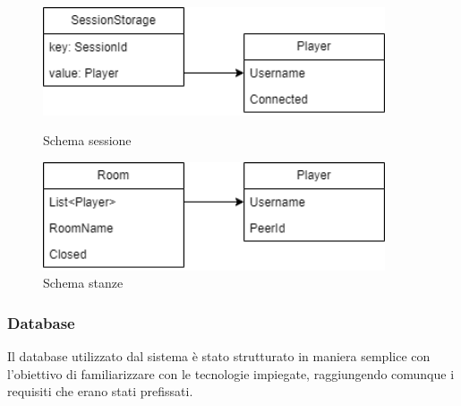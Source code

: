 \begin{figure}[H]
    \centering
    \begin{minipage}{0.45\textwidth}
        \centering
        \includegraphics[width=0.9\textwidth]{img/draw/uml_sessionstorage.png}
        \caption{Schema sessione}
        \label{fig:sessionStorage}
    \end{minipage}\hfill
    \begin{minipage}{0.45\textwidth}
        \centering
        \includegraphics[width=0.9\textwidth]{img/draw/uml_room.png}
        \caption{Schema stanze}
        \label{fig:room}
    \end{minipage}
\end{figure}

\subsubsection{Database}
Il database utilizzato dal sistema è stato strutturato in maniera semplice con l'obiettivo di familiarizzare con le tecnologie impiegate, raggiungendo comunque i requisiti che erano stati prefissati.

